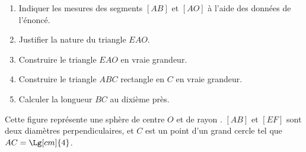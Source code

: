 \begin{exercice*}
    \begin{enumerate}
        \item Indiquer les mesures des segments $[AB]$ et $[AO]$ à l'aide des données de l'énoncé.
        \item Justifier la nature du triangle $EAO$.
        \item Construire le triangle $EAO$ en vraie grandeur.
        \item Construire le triangle $ABC$ rectangle en $C$ en vraie \mbox{grandeur}.
        \item Calculer la longueur $BC$ au dixième près.
    \end{enumerate}
\end{exercice*}
\begin{corrige}
    Cette figure représente une sphère de centre $O$ et de rayon . $[AB]$ et $[EF]$ sont deux diamètres perpendiculaires, et $C$ est un point d'un grand cercle tel que $AC = \Lg[cm]{4}$.


\end{corrige}
